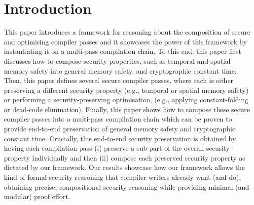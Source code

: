 \documentclass[acmsmall,review,screen,dvipsnames]{acmart}
\begin{document}

\maketitle

\section{Introduction}



This paper introduces a framework for reasoning about the composition of secure and optimising compiler passes and it showcases the power of this framework by instantiating it on a multi-pass compilation chain.
To this end, this paper first discusses how to compose security properties, such as temporal and spatial memory safety into general memory safety, and cryptographic constant time.
Then, this paper defines several secure compiler passes, where each is either preserving a different security property (e.g., temporal or spatial memory safety) or performing a security-preserving optimisation, (e.g., applying constant-folding or dead-code elimination).
Finally, this paper shows how to compose these secure compiler passes into a multi-pass compilation chain which can be proven to provide end-to-end preservation of general memory safety and cryptographic constant time. 
Crucially, this end-to-end security preservation is obtained by having each compilation pass (i) preserve a sub-part of the overall security property individually and then (ii) compose each preserved security property as dictated by our framework.
Our results showcase how our framework allows the kind of formal security reasoning that compiler writers already want (and do), obtaining precise, compositional security reasoning while providing minimal (and modular) proof effort.
\end{document}
